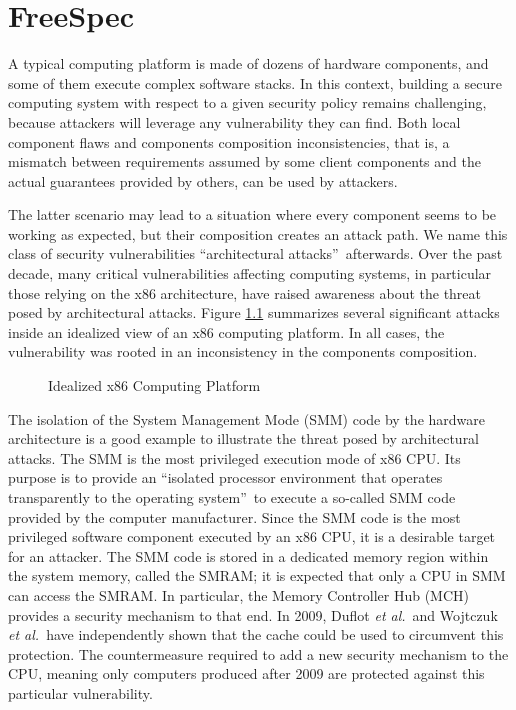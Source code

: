 \chapter{FreeSpec}
\label{chapter:freespec}

A typical computing platform is made of dozens of hardware components, and some
of them execute complex software stacks.
%
In this context, building a secure computing system with respect to a given
security policy remains challenging, because attackers will leverage any
vulnerability they can find.
%
Both local component flaws and components composition inconsistencies,
that is, a mismatch between requirements assumed by some client
components and the actual guarantees provided by others, can be
used by attackers.

The latter scenario may lead to a situation where every component
seems to be working as expected, but their composition creates an
attack path.
%
We name this class of security vulnerabilities ``architectural
attacks''\,\cite{letan2016speccert} afterwards.
%
Over the past decade, many critical vulnerabilities affecting computing systems,
in particular those relying on the x86 architecture, have raised awareness about
the threat posed by architectural attacks.
%
Figure \ref{fig:freespec:computing-platform} summarizes several significant
attacks\,\cite{wojtczuk2009smram,duflot2009smram,domas2015sinkhole,kallenberg2015racecondition,kovah2015senter,stewin2012dma}
inside an idealized view of an x86 computing platform.
%
In all cases, the vulnerability was rooted in an inconsistency in the components
composition.

\begin{figure}
  \centering 
  \caption{Idealized x86 Computing Platform}
  \label{fig:freespec:computing-platform}
\end{figure}

The isolation of the System Management Mode (SMM) code by the hardware
architecture is a good example to illustrate the threat posed by architectural
attacks.
%
The SMM is the most privileged execution mode of x86 CPU.
%
Its purpose is to provide an ``isolated processor environment that operates
transparently to the operating system''\,\cite{intel2014manual} to execute a
so-called SMM code provided by the computer manufacturer.
%
Since the SMM code is the most privileged software component executed by an x86
CPU, it is a desirable target for an attacker.
%
The SMM code is stored in a dedicated memory region within the system memory,
called the SMRAM; it is expected that only a CPU in SMM can access the SMRAM.
%
In particular, the Memory Controller Hub (MCH)\,\cite{intel2009mch} provides a
security mechanism to that end.
%
In 2009, Duflot \emph{et al.}\,\cite{duflot2009smram} and Wojtczuk \emph{et
al.}\,\cite{wojtczuk2009smram} have independently shown that the cache could be
used to circumvent this protection.
%
The countermeasure required to add a new security mechanism to the CPU, meaning
only computers produced after 2009 are protected against this particular
vulnerability.

